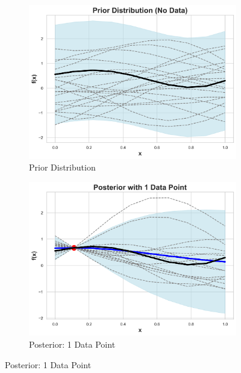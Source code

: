 \documentclass{article}
\begin{document}
\begin{figure}[H]
    \centering
    \begin{subfigure}[b]{0.4\textwidth}
        \centering
        \includegraphics[width=\textwidth]{LatexPlots/1dplots/Prior_Distribution.png}
        \caption{Prior Distribution}
    \end{subfigure}
    \begin{subfigure}[b]{0.4\textwidth}
        \centering
        \includegraphics[width=\textwidth]{LatexPlots/1dplots/Posterior_1_Data_Point.png}
        \caption{Posterior: 1 Data Point}
    \end{subfigure}
    
    \vspace{0.5cm}
    

\end{figure}
\end{document}
